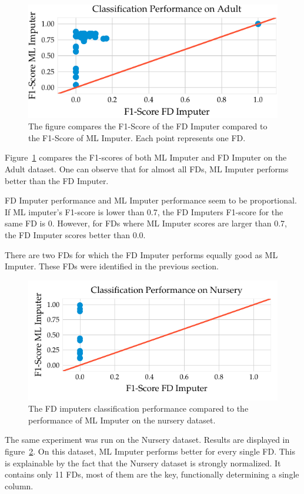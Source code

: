 \begin{figure}[ht]
     \centering
     \includegraphics[width=.8\textwidth]{../figures/adult/f1_ml_fd_adult}
     \caption{The figure compares the F1-Score of the FD Imputer compared to the F1-Score of ML Imputer. Each point represents one FD.}
     \label{fig:f1_ml_fd_adult}
 \end{figure}

Figure~\ref{fig:f1_ml_fd_adult} compares the F1-scores of both ML Imputer and FD Imputer on the Adult dataset.
One can observe that for almost all FDs, ML Imputer performs better than the FD Imputer.

FD Imputer performance and ML Imputer performance seem to be proportional.
If ML imputer's F1-score is lower than 0.7, the FD Imputers F1-score for the same FD is 0.
However, for FDs where ML Imputer scores are larger than 0.7, the FD Imputer scores better than 0.0.

There are two FDs for which the FD Imputer performs equally good as ML Imputer.
These FDs were identified in the previous section.

\begin{figure}[ht]
     \centering
     \includegraphics[width=.8\textwidth]{../figures/nursery/f1_ml_fd_nursery}
     \caption{The FD imputers classification performance compared to the performance of ML Imputer on the nursery dataset.}
     \label{fig:f1_ml_fd_nursery}
\end{figure}

The same experiment was run on the Nursery dataset.\cite{DUA19}
Results are displayed in figure~\ref{fig:f1_ml_fd_nursery}.
On this dataset, ML Imputer performs better for every single FD.
This is explainable by the fact that the Nursery dataset is strongly normalized.
It contains only 11 FDs, most of them are the key, functionally determining a single column.

